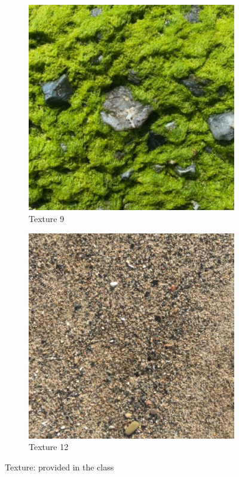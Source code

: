 \documentclass{article}
\begin{document}
\begin{figure}[htbp!]
\begin{subfigure}[b]{0.32\textwidth}
        \includegraphics[width=\textwidth]{../Code/Textures/9.png}
        \caption{Texture 9}
        \label{fig:texture-9}
    \end{subfigure}
    \hfill %
    \begin{subfigure}[b]{0.32\textwidth}
        \includegraphics[width=\textwidth]{../Code/Textures/12.png}
        \caption{Texture 12}
        \label{fig:texture-12}
    \end{subfigure}
    \caption{Texture: provided in the class}
    \label{fig:texture-class}
\end{figure}
\end{document}
